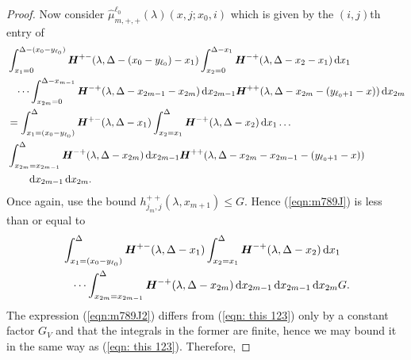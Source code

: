 \begin{proof}
        Now consider \(\widehat\mu_{m,+,+}^{\ell_0}(\lambda)( x,j;x_0,i) \) which is given by the \((i,j)\)th entry of 
        \begin{align}
		\nonumber& \int_{x_1 = 0}^{\Delta-(x_0-y_{\ell_0})} \boldsymbol H^{+-}(\lambda,\Delta-(x_0-y_{\ell_0})-x_1) \int_{x_2 = 0}^{\Delta-x_1} \boldsymbol H^{-+}(\lambda,\Delta - x_2-x_1) \, \mathrm{d} x_1 
		\\\nonumber &\quad\dots  
		\int_{x_{2m}=0}^{\Delta-x_{m-1}} \boldsymbol H^{-+}(\lambda,\Delta -x_{2m-1} - x_{2m}) \, \mathrm{d} x_{2m-1}
		 \boldsymbol H^{++}(\lambda,\Delta -x_{2m}- (y_{\ell_0+1}- x))\, \mathrm{d} x_{2m}
		\\\nonumber&= \int_{x_1 = (x_0-y_{\ell_0})}^{\Delta} \boldsymbol H^{+-}(\lambda,\Delta-x_1) \int_{x_2 = x_1}^{\Delta} \boldsymbol H^{-+}(\lambda,\Delta -x_2) \, \mathrm{d} x_1 
		\dots  
		\\&\int_{x_{2m}=x_{2m-1}}^{\Delta} \boldsymbol H^{-+}(\lambda,\Delta - x_{2m}) \, \mathrm{d} x_{2m-1}
		\boldsymbol H^{++}(\lambda,\Delta -x_{2m}-x_{2m-1}- (y_{\ell_0+1}- x))\nonumber 
		\\&\qquad {}\, \mathrm{d} x_{2m-1}\, \mathrm{d} x_{2m}.\label{eqn:m789J}
        \end{align}
        Once again, use the bound \(h^{++}_{j_m,j}(\lambda,x_{m+1})\leq G\). Hence (\ref{eqn:m789J}) is less than or equal to 
        \begin{align}
        		&\int_{x_1 = (x_0-y_{\ell_0})}^{\Delta} \boldsymbol H^{+-}(\lambda,\Delta-x_1) \int_{x_2 = x_1}^{\Delta} \boldsymbol H^{-+}(\lambda,\Delta -x_2) \, \mathrm{d} x_1 \nonumber
		\\&\quad\dots  
		\int_{x_{2m}=x_{2m-1}}^{\Delta} \boldsymbol H^{-+}(\lambda,\Delta - x_{2m}) \, \mathrm{d} x_{2m-1}
		\, \mathrm{d} x_{2m-1}\, \mathrm{d} x_{2m}G.\label{eqn:m789J2}
        \end{align}
        The expression (\ref{eqn:m789J2}) differs from (\ref{eqn: this 123}) only by a constant factor \(G_V\) and that the integrals in the former are finite, hence we may bound it in the same way as (\ref{eqn: this 123}). Therefore, 

\end{proof}
